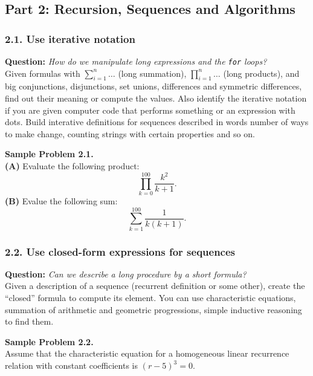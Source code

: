 \documentclass[jou]{apa6}
\begin{document}
\newpage
\subsection{Part 2: Recursion, Sequences and Algorithms}

\subsubsection{2.1. Use iterative notation}

{\bf Question:} {\em How do we manipulate long expressions and the {\tt for} loops?}\\
{\scriptsize
Given formulas with $\sum_{i=1}^n\ldots$ (long summation), $\prod_{i=1}^n\ldots$ (long products), 
and big conjunctions, disjunctions, set unions, differences and symmetric differences, 
find out their meaning or compute the values. Also identify the iterative notation 
if you are given computer code that performs something or an expression with dots. 
Build interative definitions for sequences described in words \textendash{} 
number of ways to make change, counting strings with certain properties and so on.
}



\vspace{6pt}
{\bf Sample Problem 2.1.}\\
{\bf (A)} Evaluate the following product:
$$\prod\limits_{k=0}^{100} \frac{k^2}{k+1}.$$
{\bf (B)} Evalue the following sum: 
$$\sum\limits_{k=1}^{100} \frac{1}{k(k+1)}.$$


\subsubsection{2.2. Use closed-form expressions for sequences}

{\bf Question:} {\em Can we describe a long procedure by a short formula?}\\
{\scriptsize
Given a description of a sequence (recurrent definition or some other), 
create the ``closed'' formula to compute its element. You can use 
characteristic equations, summation of arithmetic and 
geometric progressions, simple inductive reasoning to find them.
}

\vspace{6pt}
{\bf Sample Problem 2.2.}\\
Assume that the characteristic equation for a 
homogeneous linear recurrence relation with constant coefficients
is $(r-5)^3 = 0$. 
\end{document}
